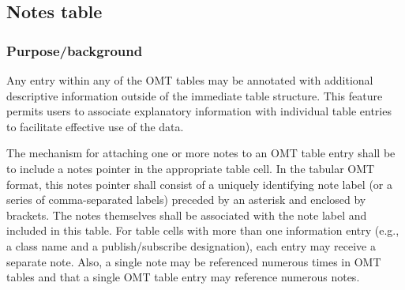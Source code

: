 \begin{center}
    \begingroup\fontsize{7.3}{8.4}\selectfont\setlength{\tabcolsep}{3.75pt}\renewcommand{\arraystretch}{1.36}
    \par\vspace{8pt}
    \endgroup
\end{center}

\subsection{Notes table}

\subsubsection{Purpose/background}
Any entry within any of the OMT tables may be annotated with additional descriptive information outside of the immediate table structure. This feature permits users to associate explanatory information with individual table entries to facilitate effective use of the data.

The mechanism for attaching one or more notes to an OMT table entry shall be to include a notes pointer in the appropriate table cell. In the tabular OMT format, this notes pointer shall consist of a uniquely identifying note label (or a series of comma-separated labels) preceded by an asterisk and enclosed by brackets. The notes themselves shall be associated with the note label and included in this table. For table cells with more than one information entry (e.g., a class name and a publish/subscribe designation), each entry may receive a separate note. Also, a single note may be referenced numerous times in OMT tables and that a single OMT table entry may reference numerous notes.

